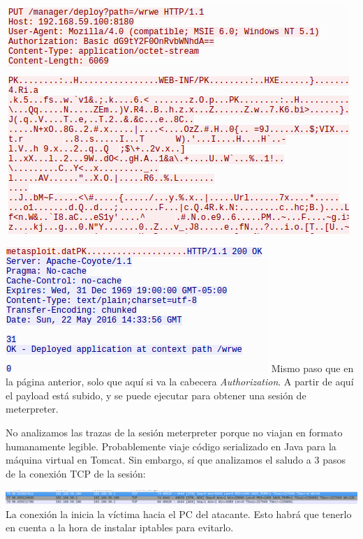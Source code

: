 \documentclass[a4paper,12pt]{scrartcl}
\begin{document}
\begin{center}
	\includegraphics[width=1\linewidth]{cap4-1}
\end{center}
\begin{center}
	\includegraphics[width=1\linewidth]{cap4-2}
	Mismo paso que en la página anterior, solo que aquí si va la cabecera \textit{Authorization}. A partir de aquí el payload está subido, y se puede ejecutar para obtener una sesión de meterpreter. 
\end{center}

No analizamos las trazas de la sesión meterpreter porque no viajan en formato humanamente legible. Probablemente viaje código serializado en Java para la máquina virtual en Tomcat. Sin embargo, sí que analizamos el saludo a 3 pasos de la conexión TCP de la sesión:

\newpage

\begin{center}
	\includegraphics[width=1\linewidth]{cap5}
	La conexión la inicia la víctima hacia el PC del atacante. Esto habrá que tenerlo en cuenta a la hora de instalar iptables para evitarlo.
\end{center}
\end{document}

